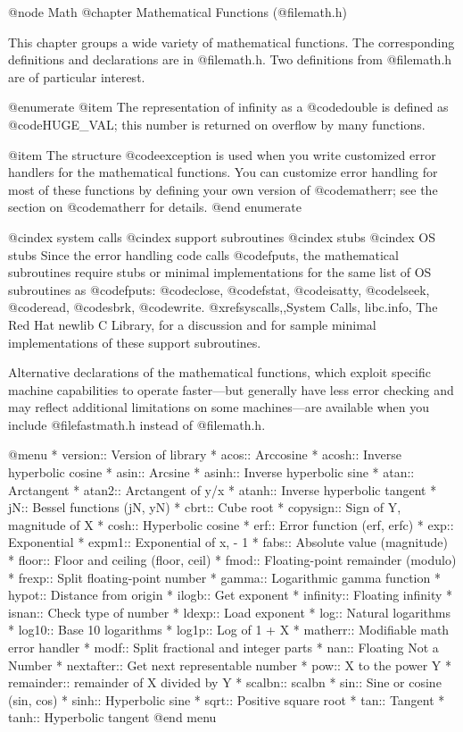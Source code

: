 @node Math
@chapter Mathematical Functions (@file{math.h})

This chapter groups a wide variety of mathematical functions.  The
corresponding definitions and declarations are in @file{math.h}.
Two definitions from @file{math.h} are of particular interest.

@enumerate
@item
The representation of infinity as a @code{double} is defined as
@code{HUGE_VAL}; this number is returned on overflow by many functions.

@item
The structure @code{exception} is used when you write customized error
handlers for the mathematical functions.  You can customize error
handling for most of these functions by defining your own version of
@code{matherr}; see the section on @code{matherr} for details.
@end enumerate

@cindex system calls
@cindex support subroutines
@cindex stubs
@cindex OS stubs
Since the error handling code calls @code{fputs}, the mathematical
subroutines require stubs or minimal implementations for the same list
of OS subroutines as @code{fputs}: @code{close}, @code{fstat},
@code{isatty}, @code{lseek}, @code{read}, @code{sbrk}, @code{write}.
@xref{syscalls,,System Calls, libc.info, The Red Hat newlib C Library},
for a discussion and for sample minimal implementations of these support
subroutines.

Alternative declarations of the mathematical functions, which exploit
specific machine capabilities to operate faster---but generally have
less error checking and may reflect additional limitations on some
machines---are available when you include @file{fastmath.h} instead of
@file{math.h}.

@menu
* version::	Version of library
* acos::	Arccosine
* acosh::	Inverse hyperbolic cosine
* asin::	Arcsine
* asinh::	Inverse hyperbolic sine
* atan::	Arctangent
* atan2::	Arctangent of y/x
* atanh::	Inverse hyperbolic tangent
* jN::	        Bessel functions  (jN, yN)
* cbrt::	Cube root
* copysign::	Sign of Y, magnitude of X
* cosh::	Hyperbolic cosine
* erf::		Error function  (erf, erfc)
* exp::		Exponential
* expm1::	Exponential of x, - 1
* fabs::	Absolute value (magnitude)
* floor::	Floor and ceiling  (floor, ceil)
* fmod::	Floating-point remainder (modulo)
* frexp::	Split floating-point number
* gamma::	Logarithmic gamma function
* hypot::	Distance from origin
* ilogb::	Get exponent
* infinity::	Floating infinity
* isnan::	Check type of number
* ldexp::	Load exponent
* log::		Natural logarithms
* log10::	Base 10 logarithms
* log1p::	Log of 1 + X
* matherr::	Modifiable math error handler
* modf::	Split fractional and integer parts
* nan::		Floating Not a Number
* nextafter::	Get next representable number
* pow::		X to the power Y
* remainder::	remainder of X divided by Y
* scalbn::	scalbn
* sin::		Sine or cosine (sin, cos)
* sinh::	Hyperbolic sine
* sqrt::	Positive square root
* tan::		Tangent
* tanh::	Hyperbolic tangent
@end menu

